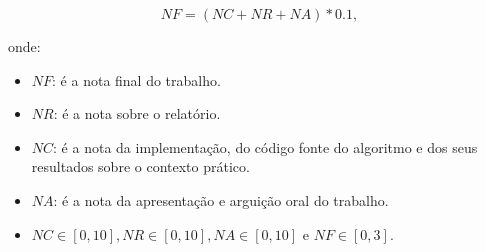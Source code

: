 \documentclass[12pt]{article}
\begin{document}
\begin{equation}
    NF = (NC+NR+NA)*0.1,
\end{equation}

\noindent onde:
\begin{itemize}
    \item $NF$: é a nota final do trabalho.
    \item $NR$: é a nota sobre o relatório.
    \item $NC$: é a nota da implementação, do código fonte do algoritmo e dos seus resultados sobre o contexto prático.
    \item $NA$: é a nota da apresentação e arguição oral do trabalho.
    \item $NC \in [0,10], NR \in [0,10], NA \in [0,10]$ e $NF \in [0,3]$.
\end{itemize}
\end{document}
